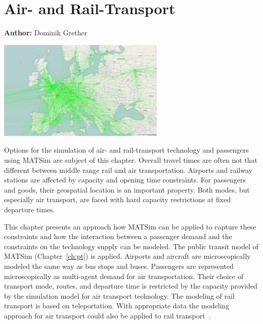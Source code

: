 \chapter{Air- and Rail-Transport}
\label{ch:air}

\hfill \textbf{Author:} Dominik Grether

\begin{center} \includegraphics[width=0.6\textwidth, angle=0]{extending/figures/air/air_network_europe_osm} \end{center}



Options for the simulation of air- and rail-transport technology and passengers using MATSim are subject of this chapter. 
Overall travel times are often not that different between middle range rail and air transportation. 
Airports and railway stations are affected by capacity and opening time constraints. 
For passengers and goods, their geospatial location is an important property. 
Both modes, but especially air transport, are faced with hard capacity restrictions at fixed departure times. 

This chapter presents an approach how MATSim can be applied to capture these constraints and how the interaction between a passenger demand and the constraints on the technology supply can be modeled. 
The public transit model of MATSim (Chapter~\ref{ch:pt}) is applied. %
Airports and aircraft are microscopically modeled the same way as bus stops and buses. 
Passengers are represented microscopically as multi-agent demand for air transportation. 
Their choice of transport mode, routes, and departure time is restricted by the capacity provided by the simulation model for air transport technology. 
The modeling of rail transport is based on teleportation. 
With appropriate data the modeling approach for air transport could also be applied to rail transport~\citep{Quick2012BARailTraffic}.  

